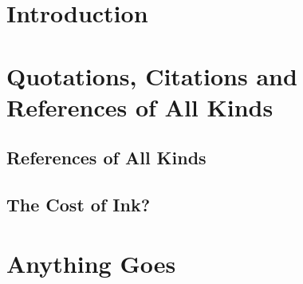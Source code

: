 \documentclass[%
twoside,symmetric,	%
nols, %
a4paper, %
notoc,	%
justified,	%
nobib, %
]{tufte-book} %
\begin{document}
	
	
	
	
	
	
	\sffamily %
	\tableofcontents
	\normalfont %
	\cleardoublepage
	
	\pagestyle{mystyle}	
	\setcounter{page}{1}
	
	\chapter{Introduction}\label{sec:introduction}
		

	\chapter[Quotes \& References]{Quotations, Citations and \\ References of All Kinds}
		
		\section[References]{References of All Kinds}
		
		\section[The Cost of Ink?]{The Cost of Ink?}
			
	\chapter[Anything Goes]{Anything Goes}
		
			
	
	\cleardoublepage %
	
	
	
\end{document}

